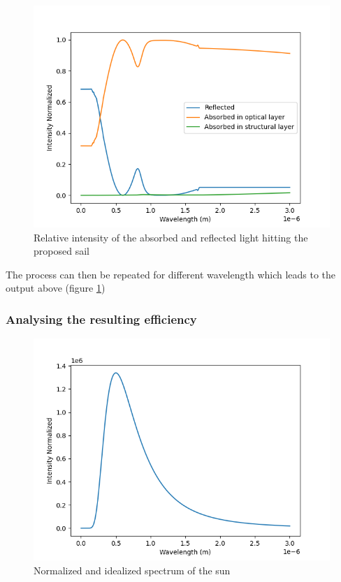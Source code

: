 \documentclass[14pt]{article}
\begin{document}
\begin{figure}[H]
  \includegraphics[width=14cm]{./python/output/reflection_and_absorption_aluminum_sail.png}
  \caption{Relative intensity of the absorbed and reflected light hitting the proposed sail}
  \label{fig:aluminum_sail}
\end{figure}

The process can then be repeated for different wavelength which leads to the output above (figure \ref{fig:aluminum_sail})

\subsubsection{Analysing the resulting efficiency}

\begin{figure}[H]
  \includegraphics[width=14cm]{./python/output/blackbody_radiation_sun.png}
  \caption{Normalized and idealized spectrum of the sun}
  \label{fig:spectrum_sun}
\end{figure}
\end{document}
